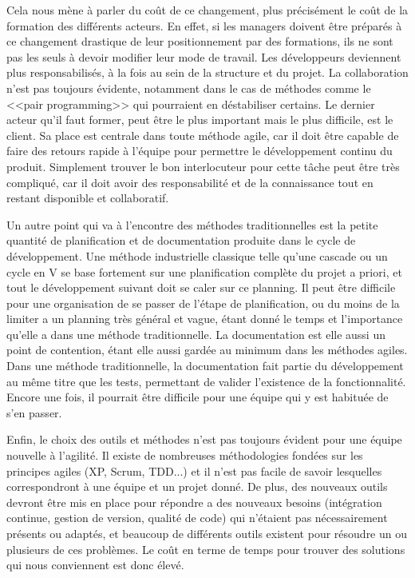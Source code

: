 \documentclass[openany, 11pt]{memoir}
\begin{document}
Cela nous mène à parler du coût de ce changement, plus précisément le coût de la formation des différents acteurs. En effet, si les managers doivent être préparés à ce changement drastique de leur positionnement par des formations, ils ne sont pas les seuls à devoir modifier leur mode de travail. Les développeurs deviennent plus responsabilisés, à la fois au sein de la structure et du projet. La collaboration n'est pas toujours évidente, notamment dans le cas de méthodes comme le <<pair programming>> qui pourraient en déstabiliser certains. Le dernier acteur qu'il faut former, peut être le plus important mais le plus difficile, est le client. Sa place est centrale dans toute méthode agile, car il doit être capable de faire des retours rapide à l'équipe pour permettre le développement continu du produit. Simplement trouver le bon interlocuteur pour cette tâche peut être très compliqué, car il doit avoir des responsabilité et de la connaissance tout en restant disponible et collaboratif.

Un autre point qui va à l'encontre des méthodes traditionnelles est la petite quantité de planification et de documentation produite dans le cycle de développement. Une méthode industrielle classique telle qu'une cascade \cite{waterfall} ou un cycle en V se base fortement sur une planification complète du projet a priori, et tout le développement suivant doit se caler sur ce planning. Il peut être difficile pour une organisation de se passer de l'étape de planification, ou du moins de la limiter a un planning très général et vague, étant donné le temps et l'importance qu'elle a dans une méthode traditionnelle. La documentation est elle aussi un point de contention, étant elle aussi gardée au minimum dans les méthodes agiles. Dans une méthode traditionnelle, la documentation fait partie du développement au même titre que les tests, permettant de valider l'existence de la fonctionnalité. Encore une fois, il pourrait être difficile pour une équipe qui y est habituée de s'en passer.

Enfin, le choix des outils et méthodes n'est pas toujours évident pour une équipe nouvelle à l'agilité. Il existe de nombreuses méthodologies fondées sur les principes agiles (XP, Scrum, TDD...) et il n'est pas facile de savoir lesquelles correspondront à une équipe et un projet donné. De plus, des nouveaux outils devront être mis en place pour répondre a des nouveaux besoins (intégration continue, gestion de version, qualité de code) qui n'étaient pas nécessairement présents ou adaptés, et beaucoup de différents outils existent pour résoudre un ou plusieurs de ces problèmes. Le coût en terme de temps pour trouver des solutions qui nous conviennent est donc élevé.
\end{document}
